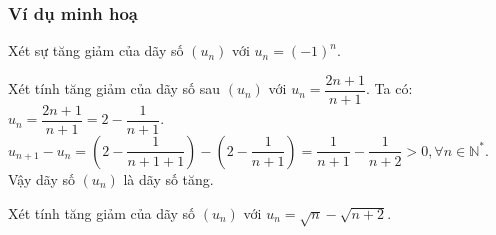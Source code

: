 \subsubsection{Ví dụ minh hoạ}
\begin{vd}[NB]%
	Xét sự tăng giảm của dãy số $(u_n)$ với $u_n=(-1)^n$.
\end{vd}
\begin{vd}[NB]%
	Xét tính tăng giảm của dãy số sau $(u_n)$ với $u_n=\dfrac{2n+1}{n+1}$.
	\loigiai
	{
		Ta có: $u_n=\dfrac{2n+1}{n+1}=2-\dfrac{1}{n+1}$.\\
		$u_{n+1}-u_n=\left(2-\dfrac{1}{n+1+1}\right)-\left(2-\dfrac{1}{n+1}\right)=\dfrac{1}{n+1}-\dfrac{1}{n+2}>0, \forall n \in \mathbb{N}^\ast$.\\
		Vậy dãy số $(u_n)$ là dãy số tăng.
	}
\end{vd}
\begin{vd}[TH]%
	Xét tính tăng giảm của dãy số $(u_n)$ với $u_n=\sqrt{n}-\sqrt{n+2}$.
\end{vd}

